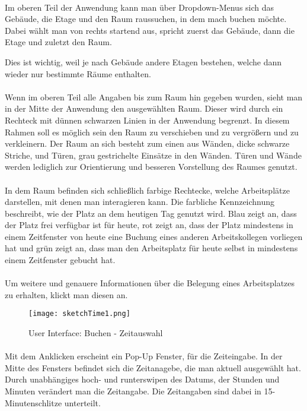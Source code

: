 \paragraph{}Im oberen Teil der Anwendung kann man über Dropdown-Menus sich das Gebäude, die Etage und den Raum raussuchen, in dem mach buchen möchte.
Dabei wählt man von rechts startend aus, spricht zuerst das Gebäude, dann die Etage und zuletzt den Raum.

Dies ist wichtig, weil je nach Gebäude andere Etagen bestehen, welche dann wieder nur bestimmte Räume enthalten.
\paragraph{}Wenn im oberen Teil alle Angaben bis zum Raum hin gegeben wurden, sieht man in der Mitte der Anwendung den ausgewählten Raum.
Dieser wird durch ein Rechteck mit dünnen  schwarzen Linien in der Anwendung begrenzt.
In diesem Rahmen soll es möglich sein den Raum zu verschieben und zu vergrößern und zu verkleinern.
Der Raum an sich besteht zum einen aus Wänden, dicke schwarze Striche, und Türen, grau gestrichelte Einsätze in den Wänden. Türen und Wände werden 
lediglich zur Orientierung und besseren Vorstellung des Raumes genutzt. 
\paragraph{}In dem Raum befinden sich schließlich farbige Rechtecke, welche Arbeitsplätze darstellen, mit denen man interagieren kann. Die farbliche Kennzeichnung beschreibt, wie der Platz an dem heutigen Tag genutzt wird.
Blau zeigt an, dass der Platz frei verfügbar ist für heute, rot zeigt an, dass der Platz mindestens in einem Zeitfenster von heute eine Buchung eines anderen Arbeitskollegen vorliegen hat und grün zeigt an, dass man den Arbeitsplatz für heute selbst in mindestens einem Zeitfenster gebucht hat.
\paragraph{}Um weitere und genauere Informationen über die Belegung eines Arbeitsplatzes zu erhalten, klickt man diesen an.

\begin{wrapfigure}{r}{5.5cm}
  \texttt{[image: sketchTime1.png]}
  \caption{User Interface: Buchen - Zeitauswahl}
\end{wrapfigure}

\paragraph{}Mit dem Anklicken erscheint ein Pop-Up Fenster, für die Zeiteingabe. 
In der Mitte des Fensters befindet sich die Zeitanagebe, die man aktuell ausgewählt hat. 
Durch unabhängiges hoch- und runterswipen des Datums, der Stunden und Minuten verändert man die Zeitangabe.
Die Zeitangaben sind dabei in 15-Minutenschlitze unterteilt.

